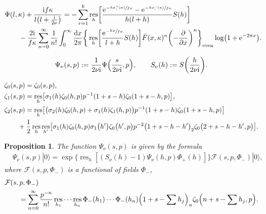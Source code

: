\documentclass[10pt,a4paper]{amsart}
\numberwithin{equation}{section}
\newtheorem{Proposition}[Theorem]{Proposition}
{ \theoremstyle{definition}
\newtheorem{Definition}[Theorem]{Definition}
\newtheorem{Remark}[Theorem]{Remark} }
\DeclareMathOperator{\res}{res}
\begin{document}
\begin{align}
& \Psi(l, \kappa)+\frac{{\rm i}f\kappa}{l\bigl(l+\frac{{\rm i}}{2\nu}\bigr)}=
-\sum_{r=1}^{k} \res_h\biggl[\frac{{\rm e}^{-\sfrac{h x_r^+(\kappa)}{f\kappa}}-{\rm e}^{-\sfrac{h x_r^-(\kappa)}{f\kappa}}}{h(l+h)}S(h)\biggr] \nonumber\\
&\qquad{}-\frac{2{\rm i}}{f\kappa} \sum\limits_{n=0}^{\infty}\frac{1}{n!} \int_0^\infty \frac{{\rm d}x}{2\pi}
\bigg\{
\res_h\biggl[\frac{{\rm e}^{-\sfrac{hx}{f\kappa}}}{l+h}S(h)\biggr] \bar{F}(x, \kappa)^n \biggl(-\frac{\partial}{\partial x}\biggr)^n
\bigg\}_{{\rm even}}
\log\bigl(1+{\rm e}^{-2\pi x}\bigr).\!\!\!\label{1_Psi_1}
\end{align}

\begin{align}
\Psi_\nu(s, p):=\frac{1}{2\nu {\rm i}}\Psi\Bigl(\frac{s}{2\nu {\rm i}}, p\Bigr), \qquad
S_\nu(h):=S\biggl(\frac{h}{2\nu {\rm i}}\biggr).\label{1_Rescale}
\end{align}

\begin{align}\label{1_Zetas}
&\zeta_0(s, p)=\zeta_0(s, p), \\
&\zeta_1(s, p)=\res_h\bigl[\sigma_1(h)\zeta_0(h, p) p^{-1}(1+s-h) \zeta_0(1+s-h, p)\bigr], \cr
&\zeta_2(s, p)=\res_h\bigl[\bigl( \sigma_2(h)\zeta_0(h, p) + \sigma_1(h)\zeta_1(h, p) \bigr) p^{-1}(1+s-h) \zeta_0(1+s-h, p) \bigr] \cr
&              \qquad{}+\frac{1}{2}\res_h\res_{h'}\bigl[\sigma_1(h) \zeta_0(h, p)\sigma_1\bigl(h'\bigr)\zeta_0\bigl(h', p\bigr)p^{-2}\bigl(1+s-h-h'\bigr)_2\zeta_0\bigl(2+s-h-h', p\bigr)\bigr]. \nonumber
\end{align}

\begin{Proposition}
\label{prop:Psi}
The function $\Psi_\nu(s, p)$ is given by the formula
\begin{align}\label{1_Psi_Proposition}
&\Psi_\nu(s, p)|0\rangle=\exp\{\res_h[(S_\nu(h)-1)\Psi_\nu(h, p)\Phi_+(h)]\} \mathcal{F}(s, p, \Phi_-)|0\rangle,
\end{align}
where $\mathcal{F}(s, p, \Phi_-)$ is a functional of fields $\Phi_{-}$,
\begin{align*}
&\mathcal{F}(s, p, \Phi_-)\\
&\qquad{}  =\sum_{n=0}^{\infty}\frac{p^{-n}}{n!}\res_{h_1}\cdots\res_{h_n} \Phi_-(h_1)\cdots\Phi_-(h_n) \Bigl(1+s-\sum h_j\Bigr)_n \zeta_0\Bigl(n+s-\sum h_j, p\Bigr).
\end{align*}
\end{Proposition}
\end{document}
